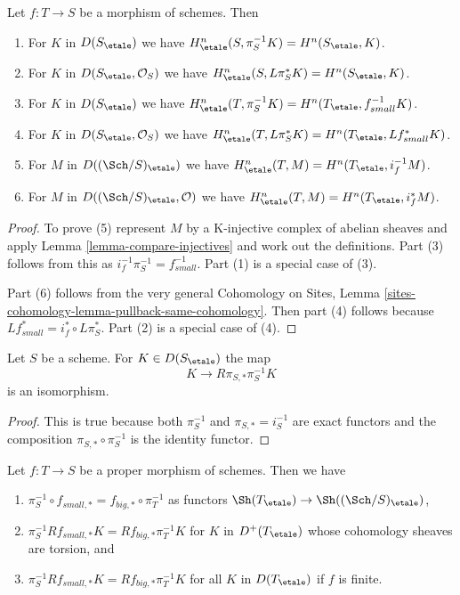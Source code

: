 \begin{lemma}
\label{lemma-compare-cohomology}
Let $f : T \to S$ be a morphism of schemes. Then
\begin{enumerate}
\item For $K$ in $D(S_\etale)$ we have
$H^n_\etale(S, \pi_S^{-1}K) = H^n(S_\etale, K)$.
\item For $K$ in $D(S_\etale, \mathcal{O}_S)$ we have
$H^n_\etale(S, L\pi_S^*K) = H^n(S_\etale, K)$.
\item For $K$ in $D(S_\etale)$ we have
$H^n_\etale(T, \pi_S^{-1}K) = H^n(T_\etale, f_{small}^{-1}K)$.
\item For $K$ in $D(S_\etale, \mathcal{O}_S)$ we have
$H^n_\etale(T, L\pi_S^*K) = H^n(T_\etale, Lf_{small}^*K)$.
\item For $M$ in $D((\Sch/S)_\etale)$ we have
$H^n_\etale(T, M) = H^n(T_\etale, i_f^{-1}M)$.
\item For $M$ in $D((\Sch/S)_\etale, \mathcal{O})$ we have
$H^n_\etale(T, M) = H^n(T_\etale, i_f^*M)$.
\end{enumerate}
\end{lemma}

\begin{proof}
To prove (5) represent $M$ by a K-injective complex of abelian sheaves
and apply Lemma \ref{lemma-compare-injectives}
and work out the definitions. Part (3) follows from
this as $i_f^{-1}\pi_S^{-1} = f_{small}^{-1}$. Part (1) is a special
case of (3).

\medskip\noindent
Part (6) follows from the very general Cohomology on Sites, Lemma
\ref{sites-cohomology-lemma-pullback-same-cohomology}. Then part
(4) follows because $Lf_{small}^* = i_f^* \circ L\pi_S^*$.
Part (2) is a special case of (4).
\end{proof}

\begin{lemma}
\label{lemma-cohomological-descent-etale}
Let $S$ be a scheme. For $K \in D(S_\etale)$ the map
$$
K \longrightarrow R\pi_{S, *}\pi_S^{-1}K
$$
is an isomorphism.
\end{lemma}

\begin{proof}
This is true because both $\pi_S^{-1}$ and $\pi_{S, *} = i_S^{-1}$
are exact functors and the composition $\pi_{S, *} \circ \pi_S^{-1}$
is the identity functor.
\end{proof}

\begin{lemma}
\label{lemma-compare-higher-direct-image-proper}
Let $f : T \to S$ be a proper morphism of schemes. Then we have
\begin{enumerate}
\item $\pi_S^{-1} \circ f_{small, *} = f_{big, *} \circ \pi_T^{-1}$
as functors $\Sh(T_\etale) \to \Sh((\Sch/S)_\etale)$,
\item $\pi_S^{-1}Rf_{small, *}K = Rf_{big, *}\pi_T^{-1}K$
for $K$ in $D^+(T_\etale)$ whose cohomology sheaves are torsion, and
\item $\pi_S^{-1}Rf_{small, *}K = Rf_{big, *}\pi_T^{-1}K$
for all $K$ in $D(T_\etale)$ if $f$ is finite.
\end{enumerate}
\end{lemma}

